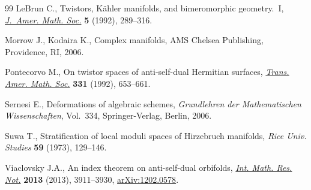 \documentclass[pdftex]{sigma}
\numberwithin{equation}{section}
\begin{document}
\begin{thebibliography}{99}
LeBrun C., Twistors, {K}\"ahler manifolds, and bimeromorphic geometry.~{I},
  \href{http://dx.doi.org/10.2307/2152769}{\textit{J.~Amer. Math. Soc.}} \textbf{5} (1992), 289--316.

Morrow J., Kodaira K., Complex manifolds, AMS Chelsea Publishing, Providence,
  RI, 2006.

Pontecorvo M., On twistor spaces of anti-self-dual {H}ermitian surfaces,
  \href{http://dx.doi.org/10.2307/2154133}{\textit{Trans. Amer. Math. Soc.}} \textbf{331} (1992), 653--661.

Sernesi E., Deformations of algebraic schemes, \textit{Grundlehren der
  Mathematischen Wissenschaften}, Vol.~334, Springer-Verlag, Berlin, 2006.

Suwa T., Stratif\/ication of local moduli spaces of {H}irzebruch manifolds,
  \textit{Rice Univ. Studies} \textbf{59} (1973), 129--146.

Viaclovsky J.A., An index theorem on anti-self-dual orbifolds, \href{http://dx.doi.org/10.1093/imrn/rns160}{\textit{Int.
  Math. Res. Not.}} \textbf{2013} (2013), 3911--3930, \href{http://arxiv.org/abs/1202.0578}{arXiv:1202.0578}.

\end{thebibliography}\LastPageEnding
\end{document}
